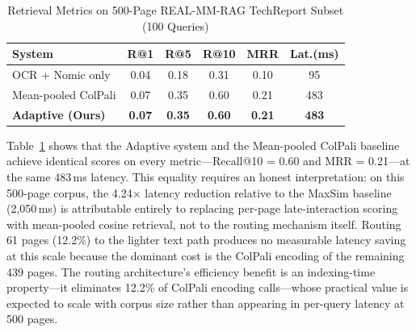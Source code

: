\documentclass[conference]{IEEEtran}
\begin{document}
\begin{table}[htbp]
\caption{Retrieval Metrics on 500-Page REAL-MM-RAG TechReport Subset (100 Queries)}
\begin{center}
\small
\begin{tabular}{|l|c|c|c|c|c|}
\hline
\textbf{System} & \textbf{R@1} & \textbf{R@5} & \textbf{R@10} & \textbf{MRR} & \textbf{Lat.(ms)} \\
\hline
OCR + Nomic only        & 0.04 & 0.18 & 0.31 & 0.10 & 95  \\
Mean-pooled ColPali     & 0.07 & 0.35 & 0.60 & 0.21 & 483 \\
\textbf{Adaptive (Ours)}& \textbf{0.07} & \textbf{0.35} & \textbf{0.60} & \textbf{0.21} & \textbf{483} \\
\hline
\end{tabular}
\end{center}
\label{tab:direct_baselines}
\end{table}
\FloatBarrier
 
\begin{table}[htbp]
\caption{External Benchmark Numbers (for Context Only)}
\begin{center}
\small
{}
\end{center}
\label{tab:external_baseline}
\end{table}
\FloatBarrier
 
Table~\ref{tab:direct_baselines} shows that the Adaptive system and the Mean-pooled ColPali baseline achieve identical scores on every metric—Recall@10 = 0.60 and MRR = 0.21—at the same 483\,ms latency. This equality requires an honest interpretation: on this 500-page corpus, the 4.24$\times$ latency reduction relative to the MaxSim baseline (2,050\,ms) is attributable entirely to replacing per-page late-interaction scoring with mean-pooled cosine retrieval, not to the routing mechanism itself. Routing 61 pages (12.2\%) to the lighter text path produces no measurable latency saving at this scale because the dominant cost is the ColPali encoding of the remaining 439 pages. The routing architecture's efficiency benefit is an indexing-time property—it eliminates 12.2\% of ColPali encoding calls—whose practical value is expected to scale with corpus size rather than appearing in per-query latency at 500 pages.
 
\end{document}

